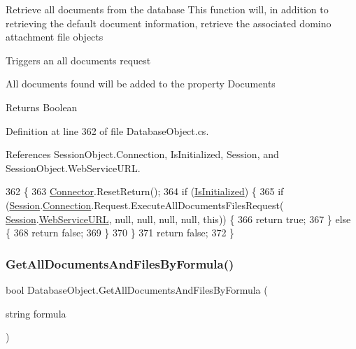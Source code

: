 Retrieve all documents from the database This function will, in addition to retrieving the default document information, retrieve the associated domino attachment file objects 

Triggers an all documents request

All documents found will be added to the property \textquotesingle{}Documents\textquotesingle{}

\begin{DoxyReturn}{Returns}
Boolean
\end{DoxyReturn}


Definition at line 362 of file Database\+Object.\+cs.



References Session\+Object.\+Connection, Is\+Initialized, Session, and Session\+Object.\+Web\+Service\+U\+RL.


\begin{DoxyCode}
362                                           \{
363         \mbox{\hyperlink{class_connector}{Connector}}.ResetReturn();
364         \textcolor{keywordflow}{if} (\mbox{\hyperlink{class_database_object_a5fe036d32a30eb10d1b3f6a30263f740}{IsInitialized}}) \{
365             \textcolor{keywordflow}{if} (\mbox{\hyperlink{class_database_object_aa8484162b7d2a7c4c9426bca13c64c07}{Session}}.\mbox{\hyperlink{class_session_object_a014bdbf705a753540e19bfb53030c55c}{Connection}}.Request.ExecuteAllDocumentsFilesRequest(
      \mbox{\hyperlink{class_database_object_aa8484162b7d2a7c4c9426bca13c64c07}{Session}}.\mbox{\hyperlink{class_session_object_a697c071c812fbf7ad1166b896fb44c16}{WebServiceURL}}, null, null, null, null, \textcolor{keyword}{this})) \{
366                 \textcolor{keywordflow}{return} \textcolor{keyword}{true};
367             \} \textcolor{keywordflow}{else} \{
368                 \textcolor{keywordflow}{return} \textcolor{keyword}{false};
369             \}
370         \}
371         \textcolor{keywordflow}{return} \textcolor{keyword}{false};
372     \}
\end{DoxyCode}
\mbox{\label{class_database_object_ac478ff9264805edc8569d510916c4c00}} 
\subsubsection{\texorpdfstring{Get\+All\+Documents\+And\+Files\+By\+Formula()}{GetAllDocumentsAndFilesByFormula()}}
{\footnotesize\ttfamily bool Database\+Object.\+Get\+All\+Documents\+And\+Files\+By\+Formula (\begin{DoxyParamCaption}\item[{string}]{formula }\end{DoxyParamCaption})}



